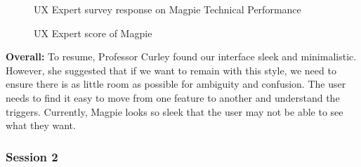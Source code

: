 \begin{figure}
    \centering
    \caption{UX Expert survey response on Magpie Technical Performance}
\end{figure}
\begin{figure}
    \centering
    \caption{UX Expert score of Magpie}
\end{figure}

\textbf{Overall: }
To resume, Professor Curley found our interface sleek and minimalistic. However, she suggested that if we want to remain with this style, we need to ensure there is as little room as possible for ambiguity and confusion. The user needs to find it easy to move from one feature to another and understand the triggers. Currently, Magpie looks so sleek that the user may not be able to see what they want.

\subsubsection{Session 2}